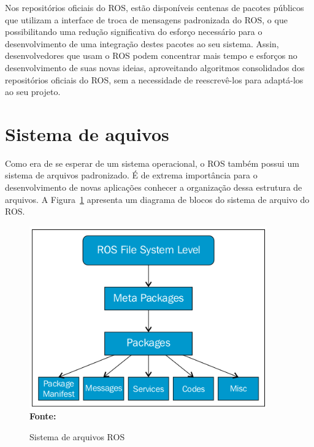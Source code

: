 Nos repositórios oficiais do ROS, estão disponíveis centenas de pacotes públicos que utilizam a interface de troca de mensagens padronizada do ROS, o que possibilitando uma redução significativa do esforço necessário para o desenvolvimento de uma integração destes pacotes ao seu sistema. Assin, desenvolvedores que usam o ROS podem concentrar mais tempo e esforços no desenvolvimento de suas novas ideias, aproveitando algoritmos consolidados dos repositórios oficiais do ROS, sem a necessidade de reescrevê-los para adaptá-los ao seu projeto.


\section{Sistema de aquivos}
Como era de se esperar de um sistema operacional, o ROS também possui um sistema de arquivos padronizado. É de extrema importância para o desenvolvimento de novas aplicações conhecer a organização dessa estrutura de arquivos. A Figura~\ref{fig:rosfile} apresenta um diagrama de blocos do sistema de arquivo do ROS\@.

\begin{figure}[ht]
	\caption{Sistema de arquivos ROS}
	\begin{center}
		\includegraphics[scale=0.7]{imagens/fileSiystem.png}\\
		{\small \textbf{Fonte:} }
    \end{center}\label{fig:rosfile}
\end{figure}

